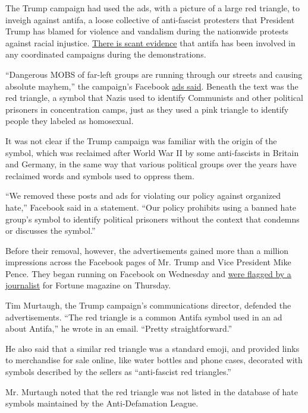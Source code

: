 The Trump campaign had used the ads, with a picture of a large red
triangle, to inveigh against antifa, a loose collective of anti-fascist
protesters that President Trump has blamed for violence and vandalism
during the nationwide protests against racial injustice.
\href{https://www.nytimes3xbfgragh.onion/2020/06/11/us/antifa-protests-george-floyd.html}{There
is scant evidence} that antifa has been involved in any coordinated
campaigns during the demonstrations.

``Dangerous MOBS of far-left groups are running through our streets and
causing absolute mayhem,'' the campaign's Facebook
\href{https://www.mediamatters.org/facebook/facebook-let-trump-campaign-run-ads-inverted-red-triangle-infamous-nazi-symbol}{ads
said}. Beneath the text was the red triangle, a symbol that Nazis used
to identify Communists and other political prisoners in concentration
camps, just as they used a pink triangle to identify people they labeled
as homosexual.

It was not clear if the Trump campaign was familiar with the origin of
the symbol, which was reclaimed after World War II by some anti-fascists
in Britain and Germany, in the same way that various political groups
over the years have reclaimed words and symbols used to oppress them.

``We removed these posts and ads for violating our policy against
organized hate,'' Facebook said in a statement. ``Our policy prohibits
using a banned hate group's symbol to identify political prisoners
without the context that condemns or discusses the symbol.''

Before their removal, however, the advertisements gained more than a
million impressions across the Facebook pages of Mr. Trump and Vice
President Mike Pence. They began running on Facebook on Wednesday and
\href{https://twitter.com/JohnBuysse/status/1273291676912701441}{were
flagged by a journalist} for Fortune magazine on Thursday.

Tim Murtaugh, the Trump campaign's communications director, defended the
advertisements. ``The red triangle is a common Antifa symbol used in an
ad about Antifa,'' he wrote in an email. ``Pretty straightforward.''

He also said that a similar red triangle was a standard emoji, and
provided links to merchandise for sale online, like water bottles and
phone cases, decorated with symbols described by the sellers as
``anti-fascist red triangles.''

Mr. Murtaugh noted that the red triangle was not listed in the database
of hate symbols maintained by the Anti-Defamation League.


